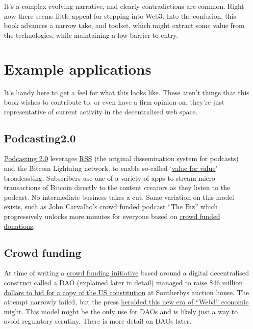 It's a complex evolving narrative, and clearly contradictions are common. Right now there seems little appeal for stepping into Web3. Into the confusion, this book advances a narrow take, and toolset, which might extract some value from the technologies, while maintaining a low barrier to entry.\par 

\section{Example applications}
It's handy here to get a feel for what this looks like. These aren't things that this book wishes to contribute to, or even have a firm opinion on, they're just representative of current activity in the decentralised web space.
\subsection{Podcasting2.0}
\href{https://medium.com/@everywheretrip/an-introduction-to-podcasting-2-0-3c4f61ea17f4}{Podcasting 2.0} leverages \href{https://www.rssboard.org/rss-specification}{RSS} (the original dissemination system for podcasts) and the Bitcoin Lightning network, to enable so-called `\href{https://www.youtube.com/watch?v=NO1aDZ6L4NQ&t=1123s}{value for value}' broadcasting. Subscribers use one of a variety of apps to stream micro-transactions of Bitcoin directly to the content creators as they listen to the podcast. No intermediate business takes a cut. Some variation on this model exists, such as John Carvalho's crowd funded podcast ``The Biz'' which progressively unlocks more minutes for everyone based on \href{https://thebiz.pro/about#crowdwall}{crowd funded donations}.
\subsection{Crowd funding}
At time of writing a \href{https://www.constitutiondao.com/}{crowd funding initiative} based around a digital decentralised construct called a DAO (explained later in detail) \href{https://www.coindesk.com/business/2021/12/06/daos-and-the-next-crowdfunding-gold-rush/}{managed to raise \$46 million dollars to bid for a copy of the US constitution} at Southerbys auction house. The attempt narrowly failed, but the press \href{https://www.coindesk.com/business/2021/12/09/what-kickstarter-going-decentralized-means-for-web-3/}{heralded this new era of ``Web3'' economic might}. This model might be the only use for DAOs and is likely just a way to avoid regulatory scrutiny. There is more detail on DAOs later.
